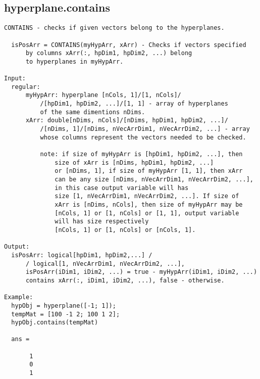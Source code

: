 \subsection{\texorpdfstring{hyperplane.contains}{contains}}\label{method:hyperplane.contains}
\begin{verbatim}
CONTAINS - checks if given vectors belong to the hyperplanes.

  isPosArr = CONTAINS(myHypArr, xArr) - Checks if vectors specified
      by columns xArr(:, hpDim1, hpDim2, ...) belong
      to hyperplanes in myHypArr.

Input:
  regular:
      myHypArr: hyperplane [nCols, 1]/[1, nCols]/
          /[hpDim1, hpDim2, ...]/[1, 1] - array of hyperplanes
          of the same dimentions nDims.
      xArr: double[nDims, nCols]/[nDims, hpDim1, hpDim2, ...]/
          /[nDims, 1]/[nDims, nVecArrDim1, nVecArrDim2, ...] - array
          whose columns represent the vectors needed to be checked.

          note: if size of myHypArr is [hpDim1, hpDim2, ...], then
              size of xArr is [nDims, hpDim1, hpDim2, ...]
              or [nDims, 1], if size of myHypArr [1, 1], then xArr
              can be any size [nDims, nVecArrDim1, nVecArrDim2, ...],
              in this case output variable will has
              size [1, nVecArrDim1, nVecArrDim2, ...]. If size of
              xArr is [nDims, nCols], then size of myHypArr may be
              [nCols, 1] or [1, nCols] or [1, 1], output variable
              will has size respectively
              [nCols, 1] or [1, nCols] or [nCols, 1].

Output:
  isPosArr: logical[hpDim1, hpDim2,...] /
      / logical[1, nVecArrDim1, nVecArrDim2, ...],
      isPosArr(iDim1, iDim2, ...) = true - myHypArr(iDim1, iDim2, ...)
      contains xArr(:, iDim1, iDim2, ...), false - otherwise.

Example:
  hypObj = hyperplane([-1; 1]);
  tempMat = [100 -1 2; 100 1 2];
  hypObj.contains(tempMat)

  ans =

       1
       0
       1
\end{verbatim}
